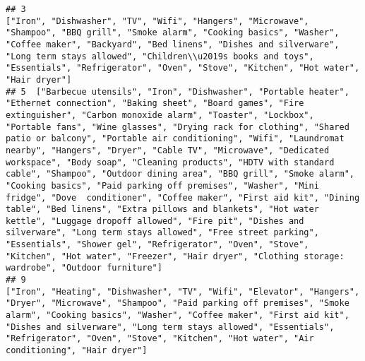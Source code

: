 \documentclass[
]{article}
\begin{document}
\begin{verbatim}
## 3                                                                                                                                                                                                                                                                                                                                                                                                                                                                                                                                                                                                                                                                                        ["Iron", "Dishwasher", "TV", "Wifi", "Hangers", "Microwave", "Shampoo", "BBQ grill", "Smoke alarm", "Cooking basics", "Washer", "Coffee maker", "Backyard", "Bed linens", "Dishes and silverware", "Long term stays allowed", "Children\\u2019s books and toys", "Essentials", "Refrigerator", "Oven", "Stove", "Kitchen", "Hot water", "Hair dryer"]
## 5  ["Barbecue utensils", "Iron", "Dishwasher", "Portable heater", "Ethernet connection", "Baking sheet", "Board games", "Fire extinguisher", "Carbon monoxide alarm", "Toaster", "Lockbox", "Portable fans", "Wine glasses", "Drying rack for clothing", "Shared patio or balcony", "Portable air conditioning", "Wifi", "Laundromat nearby", "Hangers", "Dryer", "Cable TV", "Microwave", "Dedicated workspace", "Body soap", "Cleaning products", "HDTV with standard cable", "Shampoo", "Outdoor dining area", "BBQ grill", "Smoke alarm", "Cooking basics", "Paid parking off premises", "Washer", "Mini fridge", "Dove  conditioner", "Coffee maker", "First aid kit", "Dining table", "Bed linens", "Extra pillows and blankets", "Hot water kettle", "Luggage dropoff allowed", "Fire pit", "Dishes and silverware", "Long term stays allowed", "Free street parking", "Essentials", "Shower gel", "Refrigerator", "Oven", "Stove", "Kitchen", "Hot water", "Freezer", "Hair dryer", "Clothing storage: wardrobe", "Outdoor furniture"]
## 9                                                                                                                                                                                                                                                                                                                                                                                                                                                                                                                                                                                                                                                                ["Iron", "Heating", "Dishwasher", "TV", "Wifi", "Elevator", "Hangers", "Dryer", "Microwave", "Shampoo", "Paid parking off premises", "Smoke alarm", "Cooking basics", "Washer", "Coffee maker", "First aid kit", "Dishes and silverware", "Long term stays allowed", "Essentials", "Refrigerator", "Oven", "Stove", "Kitchen", "Hot water", "Air conditioning", "Hair dryer"]

\end{verbatim}
\end{document}
